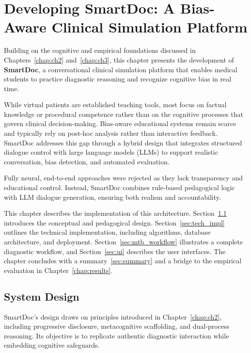 \chapter{Developing SmartDoc: A Bias-Aware Clinical Simulation Platform}
\label{chap:ch4}

Building on the cognitive and empirical foundations discussed in
Chapters~\ref{chap:ch2} and~\ref{chap:ch3}, this chapter presents the
development of \textbf{SmartDoc}, a conversational clinical simulation platform
that enables medical students to practice diagnostic reasoning and recognize
cognitive bias in real time.

While virtual patients are established teaching tools, most focus on factual
knowledge or procedural competence rather than on the cognitive processes that
govern clinical decision-making. Bias-aware educational systems remain scarce
and typically rely on post-hoc analysis rather than interactive feedback.
SmartDoc addresses this gap through a hybrid design that integrates structured
dialogue control with large language models (LLMs) to support realistic
conversation, bias detection, and automated evaluation.

Fully neural, end-to-end approaches were rejected as they lack transparency and
educational control. Instead, SmartDoc combines rule-based pedagogical logic
with LLM dialogue generation, ensuring both realism and accountability.

This chapter describes the implementation of this architecture.
Section~\ref{sec:system_design} introduces the conceptual and pedagogical design.
Section~\ref{sec:tech_impl} outlines the technical implementation, including
algorithms, database architecture, and deployment.
Section~\ref{sec:mtb_workflow} illustrates a complete diagnostic workflow, and
Section~\ref{sec:ui} describes the user interfaces.
The chapter concludes with a summary~\ref{sec:summary} and a bridge to the empirical evaluation in
Chapter~\ref{chap:results}.

\section{System Design}
\label{sec:system_design}

SmartDoc’s design draws on principles introduced in Chapter~\ref{chap:ch2},
including progressive disclosure, metacognitive scaffolding, and dual-process
reasoning. Its objective is to replicate authentic diagnostic interaction while
embedding cognitive safeguards.

